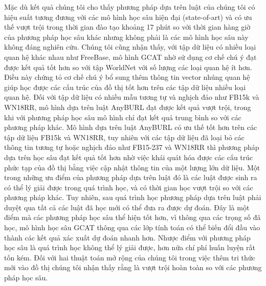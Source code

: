 Mặc dù kết quả chúng tôi cho thấy phương pháp dựa trên luật của chúng tôi có hiệu suất tương đương với các mô hình học sâu hiện đại (state-of-art) và có ưu thế vượt trội trong thời gian đào tạo khoảng 17 phút so với thời gian hàng giờ của phương pháp học sâu khác nhưng không phải là các mô hình học sâu này không đáng nghiên cứu. Chúng tôi cũng nhận thấy, với tập dữ liệu có nhiều loại quan hệ khác nhau như FreeBase, mô hình GCAT nhờ sử dụng cơ chế chú ý đạt được kết quả tốt hơn so với tập WorldNet với số lượng các loại quan hệ ít hơn.
Điều này chứng tỏ cơ chế chú ý bổ sung thêm thông tin vector nhúng quan hệ giúp học được các cấu trúc của đồ thị tốt hơn trên các tập dữ liệu nhiều loại quan hệ.
Đối với tập dữ liệu có nhiều mẫu tương tự và nghịch đảo như FB15k và WN18RR, mô hình dựa trên luật AnyBURL đạt được kết quả vượt trội, trong khi với phương pháp học sâu mô hình chỉ đạt kết quả trung bình so với các phương pháp khác.
Mô hình dựa trên luật AnyBURL có ưu thế tốt hơn trên các tập dữ liệu FB15k và WN18RR, tuy nhiên với các tập dữ liệu đã loại bỏ các thông tin tương tự hoặc nghịch đảo như FB15-237 và WN18RR thì phương pháp dựa trên học sâu đạt kết quả tốt hơn nhờ việc khái quát hóa được các cấu trúc phức tạp của đồ thị bằng việc cập nhật thông tin của một lượng lớn dữ liệu.
Một trong những ưu điểm của phương pháp dựa trên luật đó là các luật được sinh ra có thể lý giải được trong quá trình học, và có thời gian học vượt trội so với các phương pháp khác. Tuy nhiên, sau quá trình học phương pháp dựa trên luật phải duyệt qua tất cả các luật đã học mới có thể đưa ra được dự đoán. Đây là một điểm mà các phương pháp học sâu thể hiện tốt hơn, vì thông qua các trọng số đã học, mô hình học sâu GCAT thông qua các lớp tính toán có thể biến đổi đầu vào thành các kết quả xác xuất dự đoán nhanh hơn. Nhược điểm với phương pháp học sâu là quá trình học không thể lý giải được, hơn nữa chí phí huấn luyện rất tốn kém. Đối với hai thuật toán mở rộng của chúng tôi trong việc thêm tri thức mới vào đồ thị chúng tôi nhận thấy rằng là vượt trội hoàn toàn so với các phương pháp học sâu.


